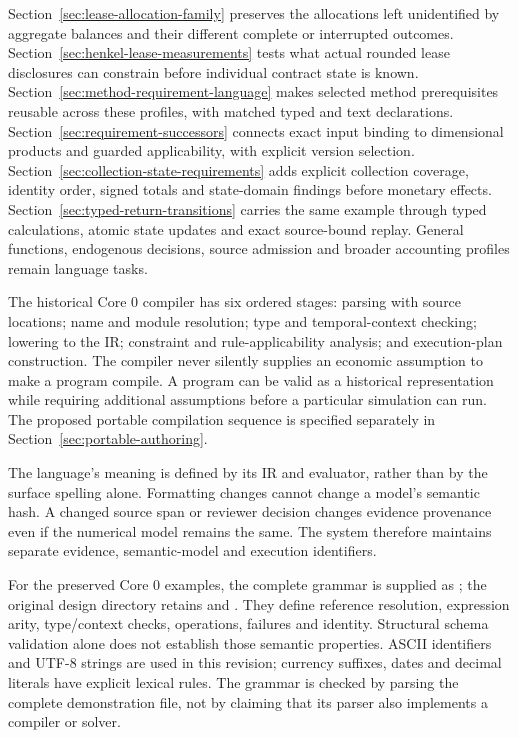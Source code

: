 Section~\ref{sec:lease-allocation-family} preserves the allocations left
unidentified by aggregate balances and their different complete or interrupted outcomes.
Section~\ref{sec:henkel-lease-measurements} tests what actual rounded lease
disclosures can constrain before individual contract state is known.
Section~\ref{sec:method-requirement-language} makes selected method prerequisites
reusable across these profiles, with matched typed and text declarations.
Section~\ref{sec:requirement-successors} connects exact input binding to
dimensional products and guarded applicability, with explicit version selection.
Section~\ref{sec:collection-state-requirements} adds explicit collection coverage,
identity order, signed totals and state-domain findings before monetary effects.
Section~\ref{sec:typed-return-transitions} carries the same example through
typed calculations, atomic state updates and exact source-bound replay.
General functions,
endogenous decisions, source admission and broader accounting profiles remain
language tasks.

The historical Core 0 compiler has six ordered stages: parsing with source locations; name and
module resolution; type and temporal-context checking; lowering to the IR;
constraint and rule-applicability analysis; and execution-plan construction.
The compiler never silently supplies an economic assumption to make a program
compile. A program can be valid as a historical representation while requiring
additional assumptions before a particular simulation can run.
The proposed portable compilation sequence is specified separately in
Section~\ref{sec:portable-authoring}.

The language's meaning is defined by its IR and evaluator, rather than by the
surface spelling alone. Formatting changes cannot change a model's semantic
hash. A changed source span or reviewer decision changes evidence provenance
even if the numerical model remains the same. The system therefore maintains
separate evidence, semantic-model and execution identifiers.

For the preserved Core 0 examples, the complete grammar is supplied as
; the original design directory retains
 and . They define reference resolution, expression arity,
type/context checks, operations, failures and identity. Structural schema
validation alone does not establish those semantic properties. ASCII
identifiers and UTF-8 strings are used in this revision; currency suffixes,
dates and decimal literals have explicit lexical rules. The grammar is checked
by parsing the complete demonstration file, not by claiming that its parser
also implements a compiler or solver.

